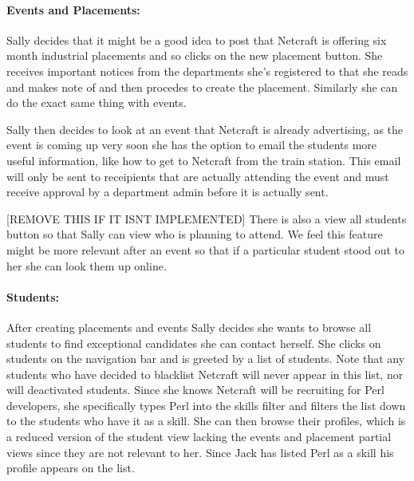   \paragraph{Events and Placements:}
    Sally decides that it might be a good idea to post that Netcraft is offering six month industrial placements and so clicks on the new placement button. 
    She receives important notices from the departments she's registered to that she reads and makes note of and then procedes to create the placement.
    Similarly she can do the exact same thing with events.

    Sally then decides to look at an event that Netcraft is already advertising, as the event is coming up very soon she has the option to email the students more useful information, like how to get to Netcraft from the train station.
    This email will only be sent to receipients that are actually attending the event and must receive approval by a department admin before it is actually sent.

    [REMOVE THIS IF IT ISNT IMPLEMENTED] There is also a view all students button so that Sally can view who is planning to attend. We feel this feature might be more relevant after an event so that if a particular student stood out to her she can look them up online.
  
  \paragraph{Students:}
    After creating placements and events Sally decides she wants to browse all students to find exceptional candidates she can contact herself. She clicks on students on the navigation bar and is greeted by a list of students. Note that any students who have decided to blacklist Netcraft will never appear in this list, nor will deactivated students.
    Since she knows Netcraft will be recruiting for Perl developers, she specifically types Perl into the skills filter
    and filters the list down to the students who have it as a skill.
    She can then browse their profiles, which is a reduced version of the student view lacking the events and placement partial views since they are not relevant to her. Since Jack has listed Perl as a skill his profile appears on the list.

